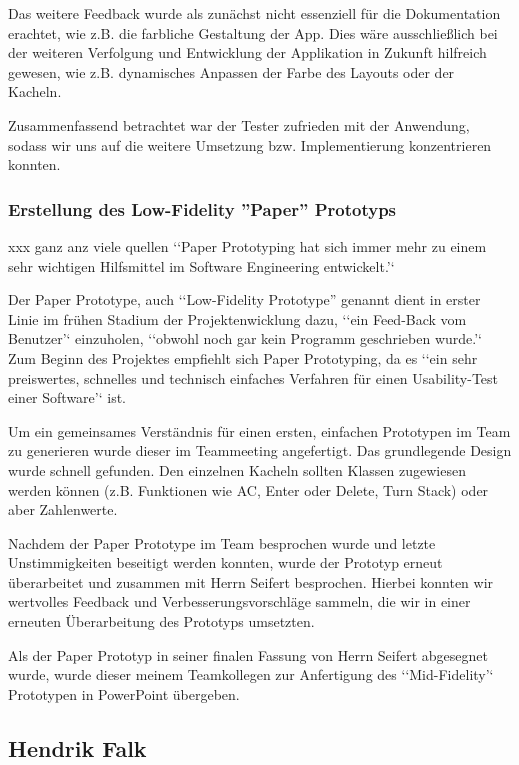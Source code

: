 Das weitere Feedback wurde als zunächst nicht essenziell für die Dokumentation erachtet, wie z.B. die farbliche Gestaltung der App. Dies wäre ausschließlich bei der weiteren Verfolgung und Entwicklung der Applikation in Zukunft hilfreich gewesen, wie z.B. dynamisches Anpassen der Farbe des Layouts oder der Kacheln. 

Zusammenfassend betrachtet war der Tester zufrieden mit der Anwendung, sodass wir uns auf die weitere Umsetzung bzw. Implementierung konzentrieren konnten. 

\subsubsection{Erstellung des Low-Fidelity ''Paper'' Prototyps}
\label{subsubsection:erstellung-low-fidelity-paper}

xxx ganz anz viele quellen
‘‘Paper Prototyping hat sich immer mehr zu einem sehr wichtigen Hilfsmittel im Software Engineering entwickelt.’‘ 

Der Paper Prototype, auch ‘‘Low-Fidelity Prototype” genannt dient in erster Linie im frühen Stadium der Projektenwicklung dazu, ‘‘ein Feed-Back vom Benutzer’‘ einzuholen, ‘‘obwohl noch gar kein Programm geschrieben wurde.’‘  Zum Beginn des Projektes empfiehlt sich Paper Prototyping, da es ‘‘ein sehr preiswertes, schnelles und technisch einfaches Verfahren für einen Usability-Test einer Software’‘  ist.

Um ein gemeinsames Verständnis für einen ersten, einfachen Prototypen im Team zu generieren wurde dieser im Teammeeting angefertigt. Das grundlegende Design wurde schnell gefunden. Den einzelnen Kacheln sollten Klassen zugewiesen werden können (z.B. Funktionen wie AC, Enter oder Delete, Turn Stack) oder aber Zahlenwerte. 

Nachdem der Paper Prototype im Team besprochen wurde und letzte Unstimmigkeiten beseitigt werden konnten, wurde der Prototyp erneut überarbeitet und zusammen mit Herrn Seifert besprochen. Hierbei konnten wir wertvolles Feedback und Verbesserungsvorschläge sammeln, die wir in einer erneuten Überarbeitung des Prototyps umsetzten. 

Als der Paper Prototyp in seiner finalen Fassung von Herrn Seifert abgesegnet wurde, wurde dieser meinem Teamkollegen zur Anfertigung des ‘‘Mid-Fidelity’‘ Prototypen in PowerPoint übergeben.



\subsection{Hendrik Falk}


